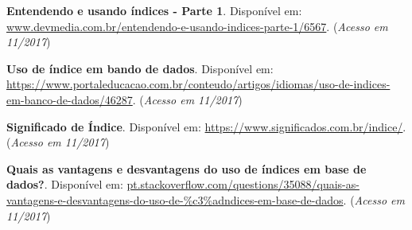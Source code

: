 \documentclass[12pt,a4paper]{article}
\begin{document}
\noindent \textbf{Entendendo e usando índices - Parte 1}. Disponível em: \url {www.devmedia.com.br/entendendo-e-usando-indices-parte-1/6567}. (\textit{Acesso em 11/2017})\\\vspace{0.2cm}

\noindent \textbf{Uso de índice em bando de dados}. Disponível em: \url {https://www.portaleducacao.com.br/conteudo/artigos/idiomas/uso-de-indices-em-banco-de-dados/46287}. (\textit{Acesso em 11/2017})\\\vspace{0.2cm}

\noindent \textbf{Significado de Índice}. Disponível em: \url {https://www.significados.com.br/indice/}. (\textit{Acesso em 11/2017})\\\vspace{0.2cm}

\noindent \textbf{Quais as vantagens e desvantagens do uso de índices em base de dados?}. Disponível em: \url {pt.stackoverflow.com/questions/35088/quais-as-vantagens-e-desvantagens-do-uso-de-\%c3\%adndices-em-base-de-dados}. (\textit{Acesso em 11/2017})
\end{document}
